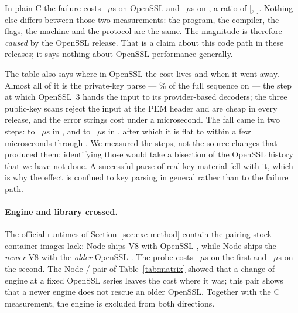 \documentclass[pdflatex,sn-basic,twocolumn]{sn-jnl}%
\begin{document}
In plain C the failure costs \CFullVThreeZeroSixteen~$\mu$s on OpenSSL \CVersionLiteralVThreeZeroSixteen{}
and \CFullVThreeFiveEight~$\mu$s on \CVersionLiteralVThreeFiveEight, a ratio of \CFullRatioOldNew{}
[\CFullRatioOldNewCiLo, \CFullRatioOldNewCiHi]. Nothing else differs between
those two measurements: the program, the compiler, the flags, the machine and
the protocol are the same. The magnitude is therefore \emph{caused} by the
OpenSSL release. That is a claim about this code path in these releases; it
says nothing about OpenSSL performance generally.

The table also says where in OpenSSL the cost lives and when it went away.
Almost all of it is the private-key parse --- \CPrivateShareVThreeZeroSixteen\%
of the full sequence on \CVersionLiteralVThreeZeroSixteen{} --- the step at which OpenSSL~3 hands the input
to its provider-based decoders; the three public-key scans reject the input at
the PEM header and are cheap in every release, and the error strings cost under
a microsecond. The fall came in two steps: to \CFullVThreeOneEight~$\mu$s in
\CVersionLiteralVThreeOneEight, and to \CFullVThreeTwoSix~$\mu$s in \CVersionLiteralVThreeTwoSix, after which it is flat to
within a few microseconds through \CProbeVersionLast. We measured the steps,
not the source changes that produced them; identifying those would take a
bisection of the OpenSSL history that we have not done. A successful parse of
real key material fell with it, which is why the effect is confined to key
parsing in general rather than to the failure path.

\paragraph{Engine and library crossed.} The official runtimes of
Section~\ref{sec:exc-method} contain the pairing stock container images lack:
Node \RtTwentyTwoLiteral{} ships V8 \RtTwentyTwoVeightFull{} with OpenSSL
\RtTwentyTwoOpenssl, while Node \RtTwentyThreeLiteral{} ships the \emph{newer}
V8 \RtTwentyThreeVeightFull{} with the \emph{older} OpenSSL
\RtTwentyThreeOpenssl. The probe costs \RtTwentyTwoProbe~$\mu$s on the first
and \RtTwentyThreeProbe~$\mu$s on the second. The Node \NodeEighteenNodeMajor/\NodeTwentyNodeMajor{} pair of
Table~\ref{tab:matrix} showed that a change of engine at a fixed OpenSSL series
leaves the cost where it was; this pair shows that a newer engine does not
rescue an older OpenSSL. Together with the C measurement, the engine is
excluded from both directions.
\end{document}
